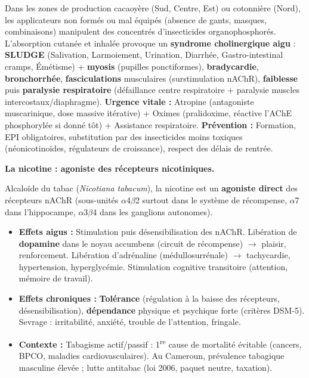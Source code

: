 \documentclass[11pt]{article}
\begin{document}
\begin{exemplebox}
Dans les zones de production cacaoyère (Sud, Centre, Est) ou cotonnière (Nord), les applicateurs non formés ou mal équipés (absence de gants, masques, combinaisons) manipulent des concentrés d'insecticides organophosphorés. L'absorption cutanée et inhalée provoque un \textbf{syndrome cholinergique aigu} : \textbf{SLUDGE} (Salivation, Larmoiement, Urination, Diarrhée, Gastro-intestinal cramps, Émétisme) + \textbf{myosis} (pupilles ponctiformes), \textbf{bradycardie}, \textbf{bronchorrhée}, \textbf{fasciculations} musculaires (surstimulation nAChR), \textbf{faiblesse} puis \textbf{paralysie respiratoire} (défaillance centre respiratoire + paralysie muscles intercostaux/diaphragme). \textbf{Urgence vitale :} Atropine (antagoniste muscarinique, dose massive itérative) + Oximes (pralidoxime, réactive l'AChE phosphorylée si donné tôt) + Assistance respiratoire. \textbf{Prévention :} Formation, EPI obligatoires, substitution par des insecticides moins toxiques (néonicotinoïdes, régulateurs de croissance), respect des délais de rentrée.
\end{exemplebox}

\textbf{La nicotine : agoniste des récepteurs nicotiniques.}\par
Alcaloïde du tabac (\emph{Nicotiana tabacum}), la nicotine est un \textbf{agoniste direct} des récepteurs nAChR (sous-unités $\alpha$4$\beta$2 surtout dans le système de récompense, $\alpha$7 dans l'hippocampe, $\alpha$3$\beta$4 dans les ganglions autonomes).
\begin{itemize}
    \item \textbf{Effets aigus :} Stimulation puis désensibilisation des nAChR. Libération de \textbf{dopamine} dans le noyau accumbens (circuit de récompense) $\rightarrow$ plaisir, renforcement. Libération d'adrénaline (médullosurrénale) $\rightarrow$ tachycardie, hypertension, hyperglycémie. Stimulation cognitive transitoire (attention, mémoire de travail).
    \item \textbf{Effets chroniques :} \textbf{Tolérance} (régulation à la baisse des récepteurs, désensibilisation), \textbf{dépendance} physique et psychique forte (critères DSM-5). Sevrage : irritabilité, anxiété, trouble de l'attention, fringale.
    \item \textbf{Contexte :} Tabagisme actif/passif : 1\textsuperscript{re} cause de mortalité évitable (cancers, BPCO, maladies cardiovasculaires). Au Cameroun, prévalence tabagique masculine élevée ; lutte antitabac (loi 2006, paquet neutre, taxation).
\end{itemize}
\end{document}
